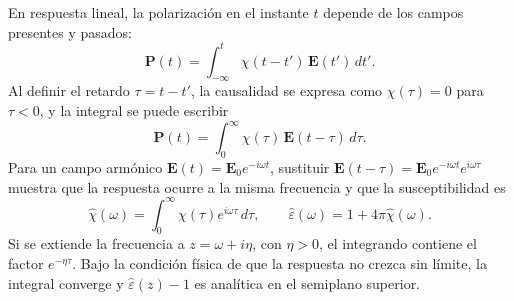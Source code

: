 En respuesta lineal, la polarizaci\'on en el instante $t$ depende de los campos presentes y pasados:
\begin{equation}
\mathbf{P}(t)=\int_{-\infty}^{t}\chi(t-t')\,\mathbf{E}(t')\,dt'.
\end{equation}
Al definir el retardo $\tau=t-t'$, la causalidad se expresa como $\chi(\tau)=0$ para $\tau<0$, y la integral se puede escribir
\begin{equation}
\mathbf{P}(t)=\int_{0}^{\infty}\chi(\tau)\,\mathbf{E}(t-\tau)\,d\tau.
\end{equation}
Para un campo arm\'onico $\mathbf{E}(t)=\mathbf{E}_0e^{-i\omega t}$, sustituir $\mathbf{E}(t-\tau)=\mathbf{E}_0e^{-i\omega t}e^{i\omega\tau}$ muestra que la respuesta ocurre a la misma frecuencia y que la susceptibilidad es
\begin{equation}
\hat\chi(\omega)=\int_{0}^{\infty}\chi(\tau)e^{i\omega\tau}\,d\tau,
\qquad \hat\varepsilon(\omega)=1+4\pi\hat\chi(\omega).
\end{equation}
Si se extiende la frecuencia a $z=\omega+i\eta$, con $\eta>0$, el integrando contiene el factor $e^{-\eta\tau}$. Bajo la condici\'on f\'isica de que la respuesta no crezca sin l\'imite, la integral converge y $\hat\varepsilon(z)-1$ es anal\'itica en el semiplano superior.

